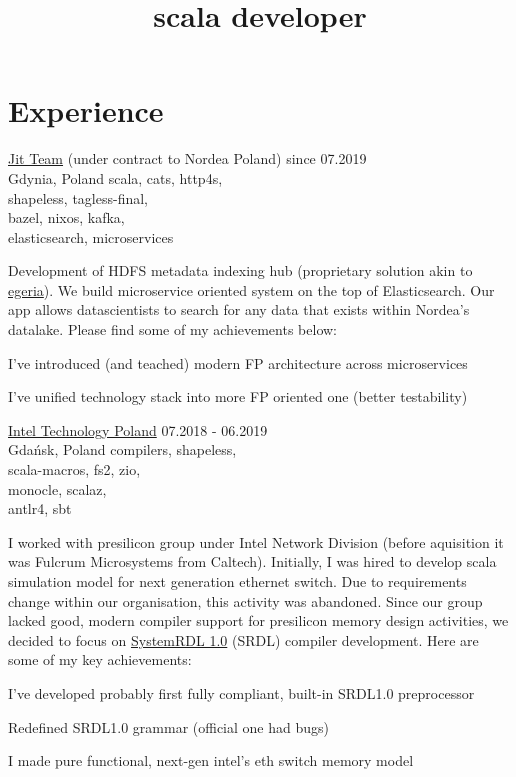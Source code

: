 \documentclass[a4paper,11pt]{cv4tw}%
\title{scala developer}
\begin{document}
\section{Experience}
      {\href{https://www.jit.team}{Jit Team} (under contract to Nordea Poland)}
      {since 07.2019\\Gdynia, Poland}
      {scala, cats, http4s,\\shapeless, tagless-final,
        \\bazel, nixos, kafka,\\elasticsearch, microservices}
      {Development of HDFS metadata indexing hub (proprietary solution akin to \href{https://egeria.odpi.org}{egeria}).
        We build microservice oriented system on the top of Elasticsearch.
        Our app allows datascientists to search for any data that exists within Nordea's datalake.
        Please find some of my achievements below:
        \begin{missions}
        \item I've introduced (and teached) modern FP architecture across microservices
        \item I've unified technology stack into more FP oriented one (better testability)
        \end{missions}
      }
      {\href{https://www.intel.com/content/www/us/en/jobs/locations/poland.html}{Intel Technology Poland}}
      {07.2018 - 06.2019\\Gdańsk, Poland}
      {compilers, shapeless,\\scala-macros, fs2, zio,\\monocle, scalaz,\\antlr4, sbt}
      {I worked with presilicon group under Intel Network Division (before aquisition it was Fulcrum Microsystems from Caltech).
        Initially, I was hired to develop scala simulation model for next generation ethernet switch.
        Due to requirements change within our organisation, this activity was abandoned.
        Since our group lacked good, modern compiler support for presilicon memory design activities, we decided to focus on
        \href{https://www.accellera.org/downloads/standards/systemrdl}{SystemRDL 1.0} (SRDL) compiler development. Here are some of my key achievements:
        \begin{missions}
        \item I've developed probably first fully compliant, built-in SRDL1.0 preprocessor
        \item Redefined SRDL1.0 grammar (official one had bugs)
        \item I made pure functional, next-gen intel's eth switch memory model
        \end{missions}
      }
\end{document}
